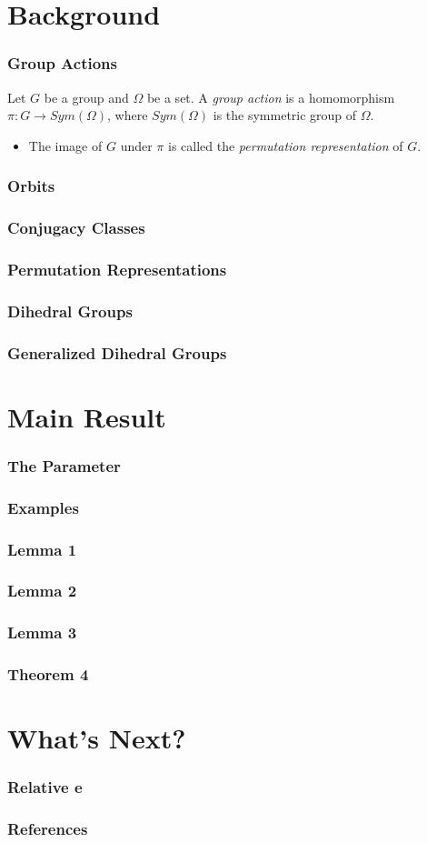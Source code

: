 \documentclass{beamer}
\begin{document}
\section{Background}

\begin{frame}
\frametitle{Group Actions}
Let $G$ be a group and $\Omega$ be a set. A \emph{group action} is a homomorphism $\pi: G \to Sym(\Omega)$, where $Sym(\Omega)$ is the symmetric group of $\Omega$.
\begin{itemize}
	\item<2-> The image of $G$ under $\pi$ is called the \emph{permutation representation} of $G$.
\end{itemize}
\end{frame}

\begin{frame}
\frametitle{Orbits}
\end{frame}

\begin{frame}
\frametitle{Conjugacy Classes}
\end{frame}

\begin{frame}
\frametitle{Permutation Representations}
\end{frame}

\begin{frame}
\frametitle{Dihedral Groups}
\end{frame}

\begin{frame}
\frametitle{Generalized Dihedral Groups}
\end{frame}


\section{Main Result}

\begin{frame}
\frametitle{The Parameter}
\end{frame}

\begin{frame}
\frametitle{Examples}
\end{frame}

\begin{frame}
\frametitle{Lemma 1}
\end{frame}

\begin{frame}
\frametitle{Lemma 2}
\end{frame}

\begin{frame}
\frametitle{Lemma 3}
\end{frame}

\begin{frame}
\frametitle{Theorem 4}
\end{frame}

\section{What's Next?}

\begin{frame}
\frametitle{Relative e}
\end{frame}

\begin{frame}
\frametitle{References}
\end{frame}
\end{document}
